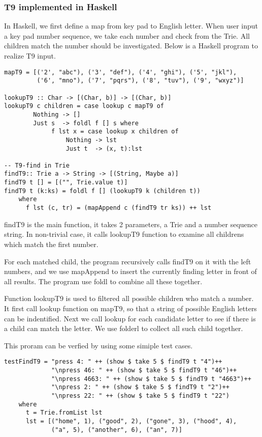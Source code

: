 \documentclass{article}
\begin{document}
\subsubsection*{T9 implemented in Haskell}

In Haskell, we first define a map from key pad to English letter. When user
input a key pad number sequence, we take each number and check from the Trie.
All children match the number should be investigated. Below is a Haskell 
program to realize T9 input.

\lstset{language=Haskell}
\begin{lstlisting}
mapT9 = [('2', "abc"), ('3', "def"), ('4', "ghi"), ('5', "jkl"), 
         ('6', "mno"), ('7', "pqrs"), ('8', "tuv"), ('9', "wxyz")]

lookupT9 :: Char -> [(Char, b)] -> [(Char, b)]
lookupT9 c children = case lookup c mapT9 of
        Nothing -> []
        Just s  -> foldl f [] s where
             f lst x = case lookup x children of
                 Nothing -> lst
                 Just t  -> (x, t):lst
        
-- T9-find in Trie
findT9:: Trie a -> String -> [(String, Maybe a)]
findT9 t [] = [("", Trie.value t)]
findT9 t (k:ks) = foldl f [] (lookupT9 k (children t))
    where
      f lst (c, tr) = (mapAppend c (findT9 tr ks)) ++ lst
\end{lstlisting}

findT9 is the main function, it takes 2 parameters, a Trie and a number
sequence string. In non-trivial case, it calls lookupT9 function to
examine all childrens which match the first number.

For each matched child, the program recursively calls findT9 on it with
the left numbers, and we use mapAppend to insert the currently finding letter
in front of all results. The program use foldl to combine all these together.

Function lookupT9 is used to filtered all possible children who match a
number. It first call lookup function on mapT9, so that a string of possible
English letters can be indentified. Next we call lookup for each candidate
letter to see if there is a child can match the letter. We use folderl to 
collect all such child together.

This proram can be verfied by using some simiple test cases.

\begin{lstlisting}
testFindT9 = "press 4: " ++ (show $ take 5 $ findT9 t "4")++
             "\npress 46: " ++ (show $ take 5 $ findT9 t "46")++
             "\npress 4663: " ++ (show $ take 5 $ findT9 t "4663")++
             "\npress 2: " ++ (show $ take 5 $ findT9 t "2")++
             "\npress 22: " ++ (show $ take 5 $ findT9 t "22")
    where
      t = Trie.fromList lst
      lst = [("home", 1), ("good", 2), ("gone", 3), ("hood", 4), 
             ("a", 5), ("another", 6), ("an", 7)]
\end{lstlisting}
\end{document}
